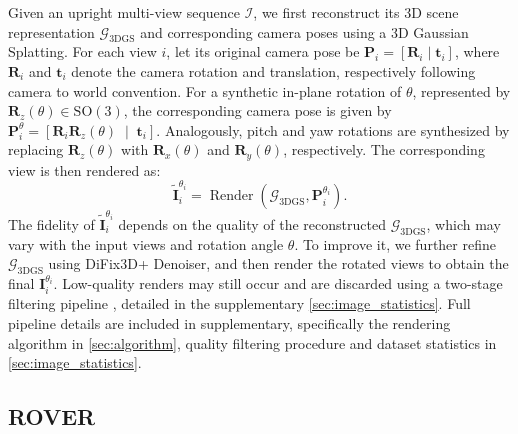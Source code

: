 Given an upright multi-view sequence $\mathcal I$, we first reconstruct its 3D scene representation $\mathcal G_{\mathrm{3DGS}}$ and corresponding camera poses using a 3D Gaussian Splatting\citep{kerbl3Dgaussians}.
For each view $i$, let its original camera pose be $\mathbf P_i=[\mathbf R_i\mid\mathbf t_i]$, where $\mathbf R_i$ and $\mathbf t_i$ denote the camera rotation and translation, respectively following camera to world convention.
For a synthetic in-plane rotation of $\theta$, represented by $\mathbf R_z(\theta) \in \mathrm{SO}(3)$, the corresponding camera pose is given by $\mathbf P_i^{\theta}=\left[\mathbf R_i\mathbf R_z(\theta)\;\middle|\;\mathbf t_i\right]$.
Analogously, pitch and yaw rotations are synthesized by replacing $\mathbf R_z(\theta)$ with $\mathbf R_x(\theta)$ and $\mathbf R_y(\theta)$, respectively.
The corresponding view is then rendered as:
$$
\tilde{\mathbf I}_i^{\theta_i}=\operatorname{Render}(\mathcal G_{\mathrm{3DGS}},\mathbf P_i^{\theta_i}).$$
The fidelity of $\tilde{\mathbf I}_i^{\theta_i}$ depends on the quality of the reconstructed $\mathcal G_{\mathrm{3DGS}}$, which may vary with the input views and rotation angle $\theta$.
To improve it, we further refine $\mathcal G_{\mathrm{3DGS}}$ using DiFix3D+\citep{wu2025difix3d} Denoiser, and then render the rotated views to obtain the final $\mathbf I_i^{\theta_i}$.
Low-quality renders may still occur and are discarded using a two-stage filtering pipeline \citep{wu2026visualquality}, detailed in the supplementary \cref{sec:image_statistics}. 
Full pipeline details are included in supplementary, specifically the rendering algorithm in \cref{sec:algorithm}, quality filtering procedure and dataset statistics in \cref{sec:image_statistics}.

\subsection{ROVER}
\label{sec:ROVER_detail}

